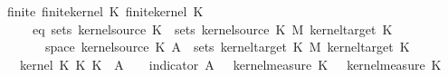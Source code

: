 \begin{isabellebody}
\ \ \ finite{\isacharcolon}{\kern0pt}\ {\isachardoublequoteopen}finite{\isacharunderscore}{\kern0pt}kernel\ K{\isacharunderscore}{\kern0pt}{}{\isachardoublequoteclose}\ {\isachardoublequoteopen}finite{\isacharunderscore}{\kern0pt}kernel\ K{\isacharunderscore}{\kern0pt}{}{\isachardoublequoteclose}\isanewline
\ \ \ \ \ \ \ eq{\isacharcolon}{\kern0pt}\ {\isachardoublequoteopen}sets\ {\isacharparenleft}{\kern0pt}kernel{\isacharunderscore}{\kern0pt}source\ K{\isacharunderscore}{\kern0pt}{}{\isacharparenright}{\kern0pt}\ {\isacharequal}{\kern0pt}\ sets\ {\isacharparenleft}{\kern0pt}kernel{\isacharunderscore}{\kern0pt}source\ K{\isacharunderscore}{\kern0pt}{}\ {\isasymOtimes}\isactrlsub M\ kernel{\isacharunderscore}{\kern0pt}target\ K{\isacharunderscore}{\kern0pt}{}{\isacharparenright}{\kern0pt}{\isachardoublequoteclose}\isanewline
\ \ \ \ \ \ \ {\isachardoublequoteopen}{\isasymomega}\ {\isasymin}\ space\ {\isacharparenleft}{\kern0pt}kernel{\isacharunderscore}{\kern0pt}source\ K{\isacharunderscore}{\kern0pt}{}{\isacharparenright}{\kern0pt}{\isachardoublequoteclose}\ {\isachardoublequoteopen}A\ {\isasymin}\ sets\ {\isacharparenleft}{\kern0pt}kernel{\isacharunderscore}{\kern0pt}target\ K{\isacharunderscore}{\kern0pt}{}\ {\isasymOtimes}\isactrlsub M\ kernel{\isacharunderscore}{\kern0pt}target\ K{\isacharunderscore}{\kern0pt}{}{\isacharparenright}{\kern0pt}{\isachardoublequoteclose}\isanewline
\ \ \ \ \ {\isachardoublequoteopen}kernel\ {\isacharparenleft}{\kern0pt}K{\isacharunderscore}{\kern0pt}{}\ {\isasymOtimes}\isactrlsub K\ K{\isacharunderscore}{\kern0pt}{}{\isacharparenright}{\kern0pt}\ {\isasymomega}\ A\ {\isacharequal}{\kern0pt}\ {\isacharparenleft}{\kern0pt}{\isasymintegral}\isactrlsup {\isacharplus}{\kern0pt}{\isasymomega}\ {\isacharparenleft}{\kern0pt}{\isasymintegral}\isactrlsup {\isacharplus}{\kern0pt}{\isasymomega}\ indicator\ A\ {\isacharparenleft}{\kern0pt}{\isasymomega}\ {\isasymomega}\ {\isasympartial}kernel{\isacharunderscore}{\kern0pt}measure\ K{\isacharunderscore}{\kern0pt}{}\ {\isacharparenleft}{\kern0pt}{\isasymomega}\ {\isasymomega}\ {\isasympartial}kernel{\isacharunderscore}{\kern0pt}measure\ K{\isacharunderscore}{\kern0pt}{}\ {\isasymomega}\isanewline

\end{isabellebody}
